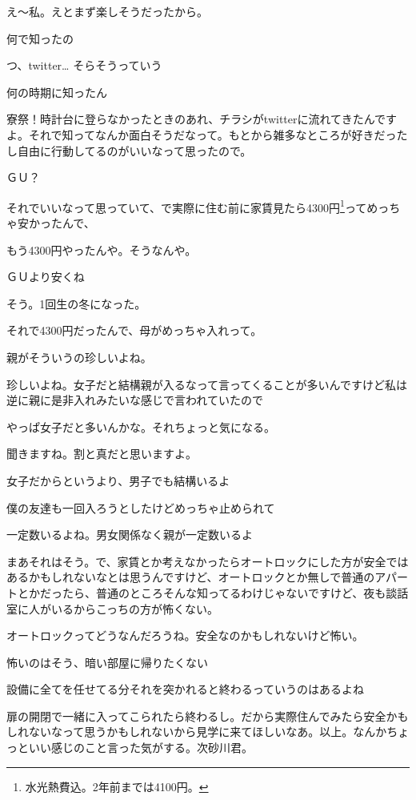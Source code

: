 \begin{multicols}{3}
え～私。えとまず楽しそうだったから。

何で知ったの

つ、twitter… そらそうっていう

何の時期に知ったん

寮祭！時計台に登らなかったときのあれ、チラシがtwitterに流れてきたんですよ。それで知ってなんか面白そうだなって。もとから雑多なところが好きだったし自由に行動してるのがいいなって思ったので。

ＧＵ？

それでいいなって思っていて、で実際に住む前に家賃見たら4300円\footnote{水光熱費込。2年前までは4100円。}ってめっちゃ安かったんで、

もう4300円やったんや。そうなんや。

ＧＵより安くね

そう。1回生の冬になった。

それで4300円だったんで、母がめっちゃ入れって。

親がそういうの珍しいよね。

珍しいよね。女子だと結構親が入るなって言ってくることが多いんですけど私は逆に親に是非入れみたいな感じで言われていたので

やっぱ女子だと多いんかな。それちょっと気になる。

聞きますね。割と真だと思いますよ。

女子だからというより、男子でも結構いるよ

僕の友達も一回入ろうとしたけどめっちゃ止められて

一定数いるよね。男女関係なく親が一定数いるよ

まあそれはそう。で、家賃とか考えなかったらオートロックにした方が安全ではあるかもしれないなとは思うんですけど、オートロックとか無しで普通のアパートとかだったら、普通のところそんな知ってるわけじゃないですけど、夜も談話室に人がいるからこっちの方が怖くない。

オートロックってどうなんだろうね。安全なのかもしれないけど怖い。

怖いのはそう、暗い部屋に帰りたくない

設備に全てを任せてる分それを突かれると終わるっていうのはあるよね

扉の開閉で一緒に入ってこられたら終わるし。だから実際住んでみたら安全かもしれないなって思うかもしれないから見学に来てほしいなあ。以上。なんかちょっといい感じのこと言った気がする。次砂川君。


\end{multicols}
